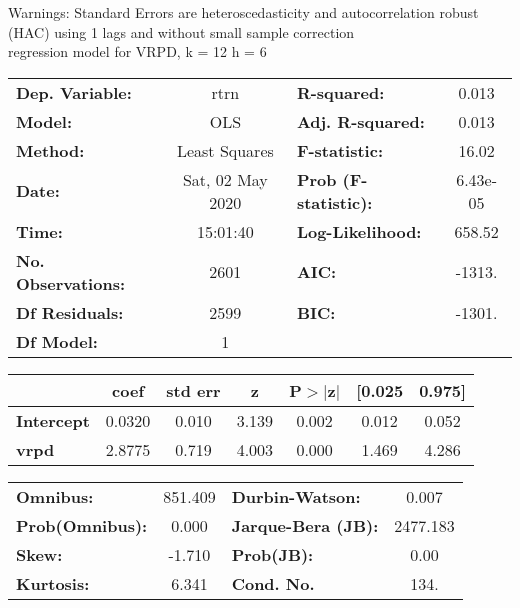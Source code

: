 Warnings: \newline
 [1] Standard Errors are heteroscedasticity and autocorrelation robust (HAC) using 1 lags and without small sample correction\\ 

regression model for VRPD, k = 12 h = 6\begin{center}
\begin{tabular}{lclc}
\toprule
\textbf{Dep. Variable:}    &       rtrn       & \textbf{  R-squared:         } &     0.013   \\
\textbf{Model:}            &       OLS        & \textbf{  Adj. R-squared:    } &     0.013   \\
\textbf{Method:}           &  Least Squares   & \textbf{  F-statistic:       } &     16.02   \\
\textbf{Date:}             & Sat, 02 May 2020 & \textbf{  Prob (F-statistic):} &  6.43e-05   \\
\textbf{Time:}             &     15:01:40     & \textbf{  Log-Likelihood:    } &    658.52   \\
\textbf{No. Observations:} &        2601      & \textbf{  AIC:               } &    -1313.   \\
\textbf{Df Residuals:}     &        2599      & \textbf{  BIC:               } &    -1301.   \\
\textbf{Df Model:}         &           1      & \textbf{                     } &             \\
\bottomrule
\end{tabular}
\begin{tabular}{lcccccc}
                   & \textbf{coef} & \textbf{std err} & \textbf{z} & \textbf{P$> |$z$|$} & \textbf{[0.025} & \textbf{0.975]}  \\
\midrule
\textbf{Intercept} &       0.0320  &        0.010     &     3.139  &         0.002        &        0.012    &        0.052     \\
\textbf{vrpd}      &       2.8775  &        0.719     &     4.003  &         0.000        &        1.469    &        4.286     \\
\bottomrule
\end{tabular}
\begin{tabular}{lclc}
\textbf{Omnibus:}       & 851.409 & \textbf{  Durbin-Watson:     } &    0.007  \\
\textbf{Prob(Omnibus):} &   0.000 & \textbf{  Jarque-Bera (JB):  } & 2477.183  \\
\textbf{Skew:}          &  -1.710 & \textbf{  Prob(JB):          } &     0.00  \\
\textbf{Kurtosis:}      &   6.341 & \textbf{  Cond. No.          } &     134.  \\
\bottomrule
\end{tabular}
\end{center}

